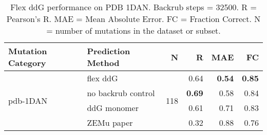\begin{table}
  \begin{tabular}{llrrrr}
\toprule
Mutation Category &   Prediction Method &    N &    R &  MAE &   FC \\
\midrule
 \multirow{ 4}{*}{pdb-1DAN} & flex ddG & \multirow{ 4}{*}{118} & 0.64 & \textbf{0.54} & \textbf{0.85}  \\
 & no backrub control & & \textbf{0.69} & 0.58 & 0.84  \\
 & ddG monomer & & 0.61 & 0.71 & 0.83  \\
 & ZEMu paper & & 0.32 & 0.88 & 0.76  \\
\bottomrule
\end{tabular}
  \caption[Flex ddG performance on PDB 1DAN]{
    Flex ddG performance on PDB 1DAN. Backrub steps = 32500. R = Pearson's R. MAE = Mean Absolute Error. FC = Fraction Correct. N = number of mutations in the dataset or subset.
  } \label{tab:table-pdb-1DAN}
\end{table}
